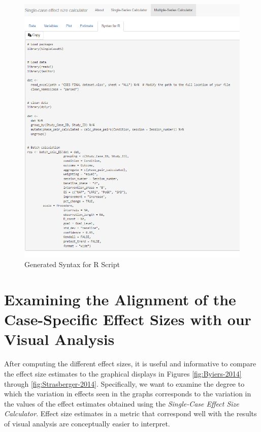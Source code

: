 \documentclass[
]{book}
\begin{document}
\begin{figure}
\includegraphics[width=1\linewidth]{images/multiseries_Rsyntax} \caption{Generated Syntax for R Script}\label{fig:multipleseries-syntax}
\end{figure}

\hypertarget{examining-the-alignment-of-the-case-specific-effect-sizes-with-our-visual-analysis}{%
\section{Examining the Alignment of the Case-Specific Effect Sizes with our Visual Analysis}\label{examining-the-alignment-of-the-case-specific-effect-sizes-with-our-visual-analysis}}

After computing the different effect sizes, it is useful and informative to compare the effect size estimates to the graphical displays in Figures \ref{fig:Byiers-2014} through \ref{fig:Strasberger-2014}. Specifically, we want to examine the degree to which the variation in effects seen in the graphs corresponds to the variation in the values of the effect estimates obtained using the \emph{Single-Case Effect Size Calculator}. Effect size estimates in a metric that correspond well with the results of visual analysis are conceptually easier to interpret.
\end{document}

